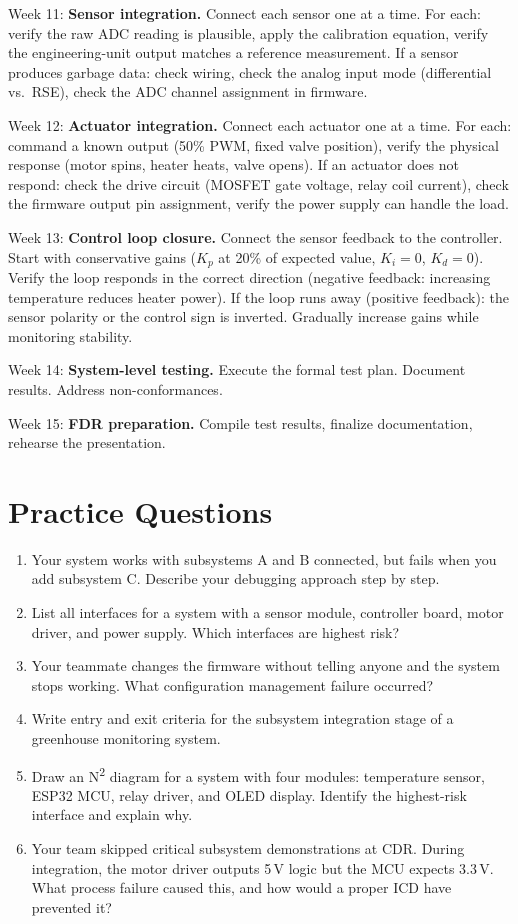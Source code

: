 \documentclass[11pt,letterpaper,twoside,openany]{book}
\begin{document}
Week 11: \textbf{Sensor integration.} Connect each sensor one at a time. For each: verify the raw ADC reading is plausible, apply the calibration equation, verify the engineering-unit output matches a reference measurement. If a sensor produces garbage data: check wiring, check the analog input mode (differential vs.\ RSE), check the ADC channel assignment in firmware.

Week 12: \textbf{Actuator integration.} Connect each actuator one at a time. For each: command a known output (50\% PWM, fixed valve position), verify the physical response (motor spins, heater heats, valve opens). If an actuator does not respond: check the drive circuit (MOSFET gate voltage, relay coil current), check the firmware output pin assignment, verify the power supply can handle the load.

Week 13: \textbf{Control loop closure.} Connect the sensor feedback to the controller. Start with conservative gains ($K_p$ at 20\% of expected value, $K_i = 0$, $K_d = 0$). Verify the loop responds in the correct direction (negative feedback: increasing temperature reduces heater power). If the loop runs away (positive feedback): the sensor polarity or the control sign is inverted. Gradually increase gains while monitoring stability.

Week 14: \textbf{System-level testing.} Execute the formal test plan. Document results. Address non-conformances.

Week 15: \textbf{FDR preparation.} Compile test results, finalize documentation, rehearse the presentation.
\section{Practice Questions}
\begin{enumerate}[leftmargin=1.5em]
\item Your system works with subsystems A and B connected, but fails when you add subsystem C. Describe your debugging approach step by step.
\item List all interfaces for a system with a sensor module, controller board, motor driver, and power supply. Which interfaces are highest risk?
\item Your teammate changes the firmware without telling anyone and the system stops working. What configuration management failure occurred?
\item Write entry and exit criteria for the subsystem integration stage of a greenhouse monitoring system.
\item Draw an N\textsuperscript{2} diagram for a system with four modules: temperature sensor, ESP32 MCU, relay driver, and OLED display. Identify the highest-risk interface and explain why.
\item Your team skipped critical subsystem demonstrations at CDR. During integration, the motor driver outputs 5\,V logic but the MCU expects 3.3\,V. What process failure caused this, and how would a proper ICD have prevented it?
\end{enumerate}
\end{document}
